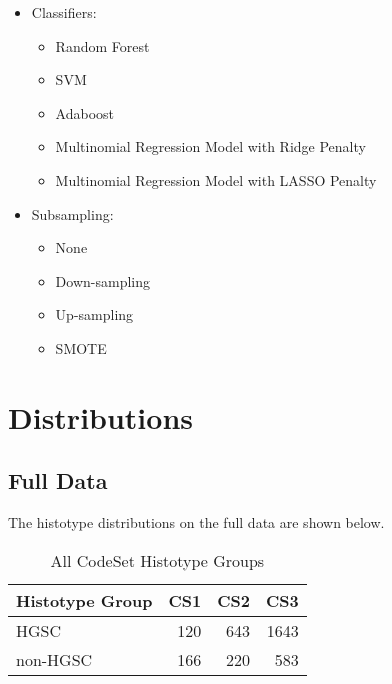 \documentclass[
]{report}
\providecommand{\tightlist}{%
  \setlength{\itemsep}{0pt}\setlength{\parskip}{0pt}}
\begin{document}
\begin{itemize}
\item
  Classifiers:

  \begin{itemize}
  \tightlist
  \item
    Random Forest
  \item
    SVM
  \item
    Adaboost
  \item
    Multinomial Regression Model with Ridge Penalty
  \item
    Multinomial Regression Model with LASSO Penalty
  \end{itemize}
\item
  Subsampling:

  \begin{itemize}
  \tightlist
  \item
    None
  \item
    Down-sampling
  \item
    Up-sampling
  \item
    SMOTE
  \end{itemize}
\end{itemize}

\hypertarget{distributions}{%
\chapter{Distributions}\label{distributions}}

\hypertarget{full-data}{%
\section{Full Data}\label{full-data}}

The histotype distributions on the full data are shown below.

\begin{table}

\caption{\label{tab:dist-all-hist-gr}All CodeSet Histotype Groups}
\centering
\begin{tabular}[t]{l|r|r|r}
\hline
Histotype Group & CS1 & CS2 & CS3\\
\hline
HGSC & 120 & 643 & 1643\\
\hline
non-HGSC & 166 & 220 & 583\\
\hline
\end{tabular}
\end{table}
\end{document}
